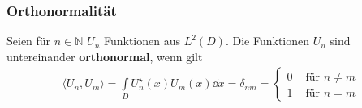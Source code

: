 	  \subsubsection{Orthonormalität}
		  Seien für $n \in \mathbb{N}$ $U_n$ Funktionen aus $L^2(D)$. Die Funktionen $U_n$ sind untereinander \textbf{orthonormal}, wenn gilt
		  \begin{equation}\begin{split}
				  \langle U_n, U_m\rangle = \int\limits_D U_n^\star (x) U_m(x) \dd x = \delta_{nm} =
				  \begin{cases}
					  0 & \text{ für } n\ne m \\
					  1 & \text{ für } n = m
				  \end{cases}
			  \end{split}\end{equation}
